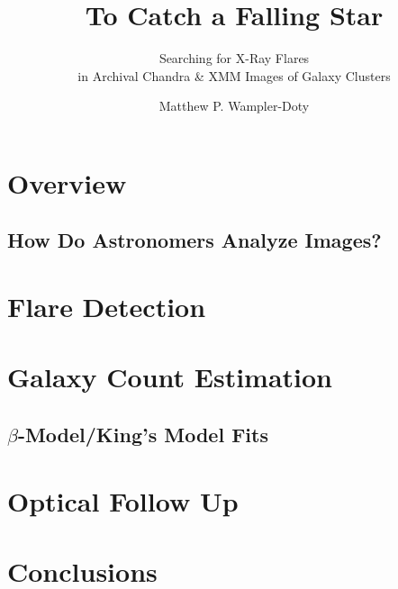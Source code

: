 \usepackage{graphicx}
\usepackage{hyperref}
\title{To Catch a Falling Star}
\subtitle{Searching for X-Ray Flares \\ 
in Archival Chandra \& XMM Images of Galaxy Clusters}
\author{Matthew P. Wampler-Doty}
\date{}

\maketitle
{}
\section{Overview}
\subsection{How Do Astronomers Analyze Images?}

\section{Flare Detection}

\section{Galaxy Count Estimation}
\subsection{$\beta$-Model/King's Model Fits}
\section{Optical Follow Up}
\section{Conclusions}

